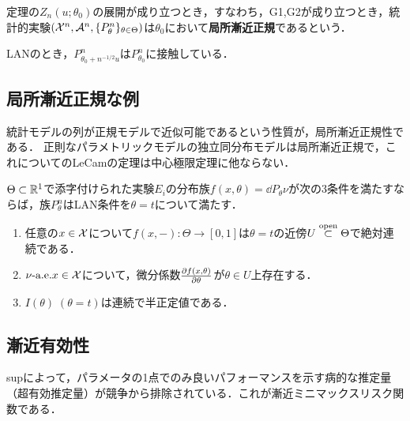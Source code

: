 \documentclass[uplatex,dvipdfmx]{jsreport}
\begin{document}
\begin{definition}
    定理の$Z_n(u;\theta_0)$の展開が成り立つとき，すなわち，G1,G2が成り立つとき，統計的実験$(\mathcal{X}^n,\mathcal{A}^n,\{P^n_\theta\}_{\theta\in\Theta})$は$\theta_0$において\textbf{局所漸近正規}であるという．
\end{definition}
\begin{remarks}
    LANのとき，$P^n_{\theta_0+n^{-1/2}u}$は$P^n_{\theta_0}$に接触している．
\end{remarks}

\subsection{局所漸近正規な例}

\begin{tcolorbox}[colframe=ForestGreen, colback=ForestGreen!10!white,breakable,colbacktitle=ForestGreen!40!white,coltitle=black,fonttitle=\bfseries\sffamily,
title=]
    統計モデルの列が正規モデルで近似可能であるという性質が，局所漸近正規性である．
    正則なパラメトリックモデルの独立同分布モデルは局所漸近正規で，これについてのLeCamの定理は中心極限定理に他ならない．
\end{tcolorbox}

\begin{theorem}[Hajekの十分条件]
    $\Theta\subset\mathbb{R}^1$で添字付けられた実験$E_i$の分布族$f(x,\theta)=\dd{P_\theta}{\nu}$が次の3条件を満たすならば，族$P^n_\theta$はLAN条件を$\theta=t$について満たす．
    \begin{enumerate}
        \item 任意の$x\in\mathcal{X}$について$f(x,-):\Theta\to[0,1]$は$\theta=t$の近傍$U\overset{\mathrm{open}}{\subset}\Theta$で絶対連続である．
        \item $\nu\text{-a.e.} x\in\mathcal{X}$について，微分係数$\frac{\partial f(x,\theta)}{\partial \theta}$が$\theta\in U$上存在する．
        \item $I(\theta)\;(\theta=t)$は連続で半正定値である．
    \end{enumerate}
\end{theorem}

\subsection{漸近有効性}

\begin{tcolorbox}[colframe=ForestGreen, colback=ForestGreen!10!white,breakable,colbacktitle=ForestGreen!40!white,coltitle=black,fonttitle=\bfseries\sffamily,
title=]
    supによって，パラメータの1点でのみ良いパフォーマンスを示す病的な推定量（超有効推定量）が競争から排除されている．これが漸近ミニマックスリスク関数である．
\end{tcolorbox}
\end{document}
